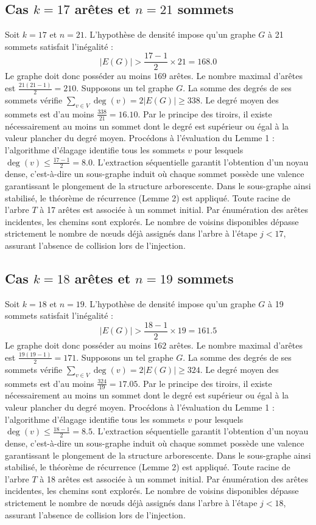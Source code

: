 \documentclass[12pt,a4paper]{article}
\begin{document}
\subsection{Cas $k = 17$ arêtes et $n = 21$ sommets}
Soit $k = 17$ et $n = 21$. L'hypothèse de densité impose qu'un graphe $G$ à 21 sommets satisfait l'inégalité :
$$ |E(G)| > \frac{17-1}{2} \times 21 = 168.0 $$
Le graphe doit donc posséder au moins $169$ arêtes. Le nombre maximal d'arêtes est $\frac{21(21-1)}{2} = 210$.
Supposons un tel graphe $G$. La somme des degrés de ses sommets vérifie $\sum_{v \in V} \deg(v) = 2|E(G)| \geq 338$.
Le degré moyen des sommets est d'au moins $\frac{338}{21} = 16.10$.
Par le principe des tiroirs, il existe nécessairement au moins un sommet dont le degré est supérieur ou égal à la valeur plancher du degré moyen.
Procédons à l'évaluation du Lemme 1 : l'algorithme d'élagage identifie tous les sommets $v$ pour lesquels $\deg(v) \leq \frac{17-1}{2} = 8.0$.
L'extraction séquentielle garantit l'obtention d'un noyau dense, c'est-à-dire un sous-graphe induit où chaque sommet possède une valence garantissant le plongement de la structure arborescente.
Dans le sous-graphe ainsi stabilisé, le théorème de récurrence (Lemme 2) est appliqué. Toute racine de l'arbre $T$ à 17 arêtes est associée à un sommet initial. Par énumération des arêtes incidentes, les chemins sont explorés. Le nombre de voisins disponibles dépasse strictement le nombre de nœuds déjà assignés dans l'arbre à l'étape $j < 17$, assurant l'absence de collision lors de l'injection.

\subsection{Cas $k = 18$ arêtes et $n = 19$ sommets}
Soit $k = 18$ et $n = 19$. L'hypothèse de densité impose qu'un graphe $G$ à 19 sommets satisfait l'inégalité :
$$ |E(G)| > \frac{18-1}{2} \times 19 = 161.5 $$
Le graphe doit donc posséder au moins $162$ arêtes. Le nombre maximal d'arêtes est $\frac{19(19-1)}{2} = 171$.
Supposons un tel graphe $G$. La somme des degrés de ses sommets vérifie $\sum_{v \in V} \deg(v) = 2|E(G)| \geq 324$.
Le degré moyen des sommets est d'au moins $\frac{324}{19} = 17.05$.
Par le principe des tiroirs, il existe nécessairement au moins un sommet dont le degré est supérieur ou égal à la valeur plancher du degré moyen.
Procédons à l'évaluation du Lemme 1 : l'algorithme d'élagage identifie tous les sommets $v$ pour lesquels $\deg(v) \leq \frac{18-1}{2} = 8.5$.
L'extraction séquentielle garantit l'obtention d'un noyau dense, c'est-à-dire un sous-graphe induit où chaque sommet possède une valence garantissant le plongement de la structure arborescente.
Dans le sous-graphe ainsi stabilisé, le théorème de récurrence (Lemme 2) est appliqué. Toute racine de l'arbre $T$ à 18 arêtes est associée à un sommet initial. Par énumération des arêtes incidentes, les chemins sont explorés. Le nombre de voisins disponibles dépasse strictement le nombre de nœuds déjà assignés dans l'arbre à l'étape $j < 18$, assurant l'absence de collision lors de l'injection.
\end{document}
